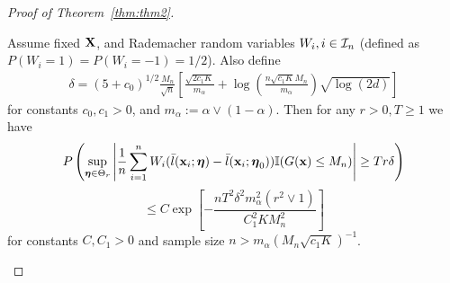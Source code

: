 \documentclass[11pt,letterpaper]{article}
\numberwithin{equation}{section}
\begin{document}
\begin{proof}[Proof of Theorem~\ref{thm:thm2}]
\begin{Lemma}\label{lemma:thm2lemma2}
Assume fixed ${\mathbf{X}}$, and Rademacher random variables $W_i, i \in {\cal{I}}_n$ (defined as $P(W_i = 1) = P(W_i = -1) = 1/2$). Also define
%
\begin{align}\label{eqn:defineDelta}
\delta = ( 5 + c_0 )^{1/2} \frac{M_n}{\sqrt n} \left[ \frac{ \sqrt{2 c_1 K}}{m_\alpha} + 
\log \left( \frac{n \sqrt{c_1 K} M_n}{m_\alpha} \right) \sqrt{ \log (2d)} \right]
\end{align}
%
for constants $c_0, c_1 > 0$, and $m_\alpha := \alpha \vee (1-\alpha)$. Then for any $r>0, T \geq 1$ we have
%
$$
P \left( \sup_{{\boldsymbol{\eta}} \in \Theta_r} \left| \frac{1}{n} \sum_{i=1}^n W_i (\bar l({\bf{x}}_i; {\boldsymbol{\eta}}) -  \bar l( {\bf{x}}_i; {\boldsymbol{\eta}}_0)) {\mathbb{I}}(G({\bf{x}}) \leq M_n ) \right| \geq T r \delta \right) $$
$$ \leq C \exp \left[ - \frac{n T^2 \delta^2 m_\alpha^2 ( r^2 \vee 1)}{ C_1^2 K M_n^2} \right]
$$
%
for constants $C, C_1 > 0$ and sample size $n > m_\alpha (M_n \sqrt{c_1 K})^{-1}$.
\end{Lemma}


\end{proof}
\end{document}
